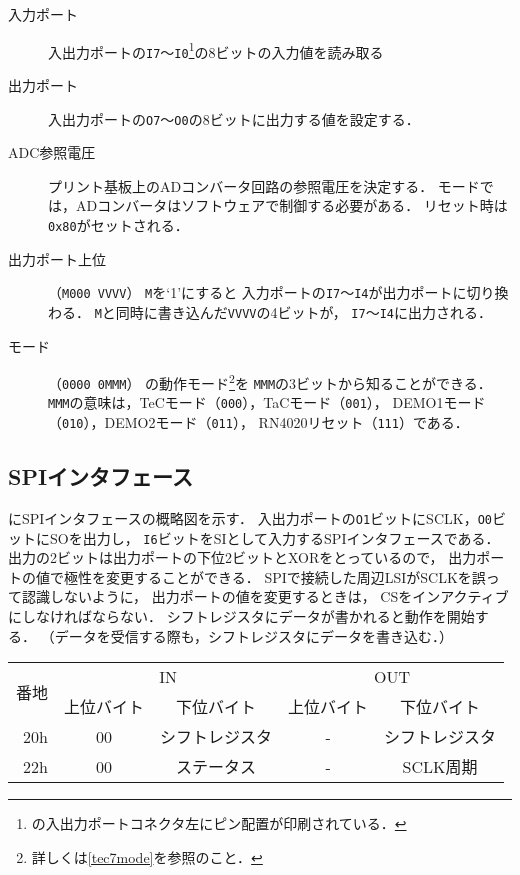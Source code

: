 \begin{description}
\item[入力ポート]
  入出力ポートの\texttt{I7}〜\texttt{I0}\footnote{
    の入出力ポートコネクタ左にピン配置が印刷されている．
  }の8ビットの入力値を読み取る
\item[出力ポート]
  入出力ポートの\texttt{O7}〜\texttt{O0}の8ビットに出力する値を設定する．
\item[ADC参照電圧]
  プリント基板上のADコンバータ回路の参照電圧を決定する．
  {\tac}モードでは，ADコンバータはソフトウェアで制御する必要がある．
  リセット時は\texttt{0x80}がセットされる．
\item[出力ポート上位]（\texttt{M000 VVVV}）
  \texttt{M}を`1'にすると
  入力ポートの\texttt{I7}〜\texttt{I4}が出力ポートに切り換わる．
  \texttt{M}と同時に書き込んだ\texttt{VVVV}の4ビットが，
  \texttt{I7}〜\texttt{I4}に出力される．
\item[モード]（\texttt{0000 0MMM}）
  {\tecS}の動作モード\footnote{詳しくは\ref{tec7mode}を参照のこと．}を
  \texttt{MMM}の3ビットから知ることができる．
  \texttt{MMM}の意味は，TeCモード（\texttt{000}），TaCモード（\texttt{001}），
  DEMO1モード（\texttt{010}），DEMO2モード（\texttt{011}），
  RN4020リセット（\texttt{111}）である．
\end{description}

\subsection{SPIインタフェース}

にSPIインタフェースの概略図を示す．
入出力ポートの\texttt{O1}ビットにSCLK，\texttt{O0}ビットにSOを出力し，
\texttt{I6}ビットをSIとして入力するSPIインタフェースである．
出力の2ビットは出力ポートの下位2ビットとXORをとっているので，
出力ポートの値で極性を変更することができる．
SPIで接続した周辺LSIがSCLKを誤って認識しないように，
出力ポートの値を変更するときは，
CSをインアクティブにしなければならない．
シフトレジスタにデータが書かれると動作を開始する．
（データを受信する際も，シフトレジスタにデータを書き込む．）


\begin{center}
  \small\begin{tabular}{| r | c | c || c | c |}\hline
    \multirow{2}{*}{番地}
    & \multicolumn{2}{|c||}{IN}
    & \multicolumn{2}{c|}{OUT}
    \\\cline{2-5}
         & 上位バイト & 下位バイト & 上位バイト & 下位バイト
    \\\hline\hline
    20h  &  00 & シフトレジスタ
         &  -  & シフトレジスタ \\\hline
    22h  &  00 & ステータス
         &  -  & SCLK周期       \\\hline
  \end{tabular}
\end{center}

